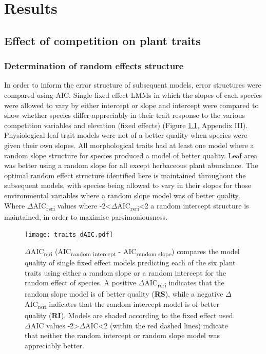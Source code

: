 \documentclass[a4paper,10pt,]{report}
\begin{document}
 \clearpage
\chapter{Results}
\section{Effect of competition on plant traits}
\subsection*{Determination of random effects structure}
In order to inform the error structure of subsequent models, error structures were compared using AIC. Single fixed effect LMMs in which the slopes of each species were allowed to vary by either intercept or slope and intercept were compared to show whether species differ appreciably in their trait response to the various competition variables and elevation (fixed effects) (Figure \ref{fig:traits_dAIC}, Appendix III). Physiological leaf trait models were not of a better quality when species were given their own slopes. All morphological traits had at least one model where a random slope structure for species produced a model of better quality. Leaf area was better using a random slope for all except herbaceous plant abundance. The optimal random effect structure identified here is maintained throughout the subsequent models, with species being allowed to vary in their slopes for those environmental variables where a random slope model was of better quality. Where $\Delta$AIC\textsubscript{rsri} values where -2<$\Delta$AIC\textsubscript{rsri}<2 a random intercept structure is maintained, in order to maximise parsimoniousness.

\begin{figure}[H]
\centering
\texttt{[image: traits\_dAIC.pdf]}
\caption{$\Delta$AIC\textsubscript{rsri} (AIC\textsubscript{random intercept} - AIC\textsubscript{random slope}) compares the model quality of single fixed effect models predicting each of the six plant traits using either a random slope or a random intercept for the random effect of species. A positive $\Delta$AIC\textsubscript{rsri} indicates that the random slope model is of better quality (\textbf{RS}), while a negative $\Delta$AIC\textsubscript{rsri} indicates that the random intercept model is of better quality (\textbf{RI}). Models are shaded according to the fixed effect used. $\Delta$AIC values -2>$\Delta$AIC<2 (within the red dashed lines) indicate that neither the random intercept or random slope model was appreciably better.}
\label{fig:traits_dAIC}
\end{figure}
\end{document}
